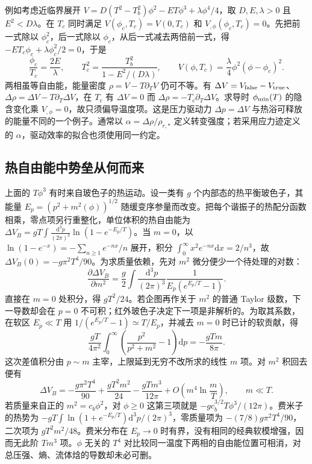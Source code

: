 例如考虑近临界展开 $V=D(T^2-T_b^2)\phi^2-E T\phi^3+\lambda\phi^4/4$，取 $D,E,\lambda>0$ 且 $E^2<D\lambda$。在 $T_c$ 同时满足 $V(\phi_c,T_c)=V(0,T_c)$ 和 $V_{,\phi}(\phi_c,T_c)=0$。先把前一式除以 $\phi_c^2$，后一式除以 $\phi_c$，从后一式减去两倍前一式，得 $-ET_c\phi_c+\lambda\phi_c^2/2=0$，于是
\[
 \frac{\phi_c}{T_c}=\frac{2E}{\lambda},\qquad
 T_c^2=\frac{T_b^2}{1-E^2/(D\lambda)},\qquad
 V(\phi,T_c)=\frac{\lambda}{4}\phi^2(\phi-\phi_c)^2 .
\]
两相虽等自由能，能量密度 $\rho=V-T\partial_TV$ 仍可不等。有 $\Delta V=V_{\rm false}-V_{\rm true}$、$\Delta\rho=\Delta V-T\partial_T\Delta V$，在 $T_c$ 有 $\Delta V=0$ 而 $\Delta\rho=-T_c\partial_T\Delta V$。求导时 $\phi_{\rm min}(T)$ 的隐含变化乘 $V_{,\phi}=0$，故只须偏导温度项。这是压力驱动力 $\Delta p=\Delta V$ 与热浴可释放的能量不同的一个例子。通常以 $\alpha=\Delta\rho/\rho_{r,*}$ 定义转变强度；若采用应力迹定义的 $\alpha$，驱动效率的拟合也须使用同一约定。


\subsection{热自由能中势垒从何而来}

上面的 $T\phi^3$ 有时来自玻色子的热运动。设一类有 $g$ 个内部态的热平衡玻色子，其能量 $E_p=(p^2+m^2(\phi))^{1/2}$ 随缓变序参量而改变。把每个谐振子的热配分函数相乘，零点项另行重整化，单位体积的热自由能为 $\Delta V_B=gT\int\frac{\mathrm d^3p}{(2\pi)^3} \ln(1-e^{-E_p/T})$。当 $m=0$，以 $\ln(1-e^{-x})=-\sum_{n\ge1}e^{-nx}/n$ 展开，积分 $\int_0^\infty x^2e^{-nx}\mathrm dx=2/n^3$，故 $\Delta V_B(0)=-g\pi^2T^4/90$。为求质量依赖，先对 $m^2$ 微分便少一个待处理的对数：
\[
 \frac{\partial\Delta V_B}{\partial m^2}
 =\frac g2\int\frac{\mathrm d^3p}{(2\pi)^3}
                \frac{1}{E_p(e^{E_p/T}-1)}.
\]
直接在 $m=0$ 处积分，得 $gT^2/24$。若企图再作关于 $m^2$ 的普通 Taylor 级数，下一导数却会在 $p=0$ 不可积；红外玻色子决定下一项是非解析的。为取其系数，在软区 $E_p\ll T$ 用 $1/(e^{E_p/T}-1)\simeq T/E_p$，并减去 $m=0$ 时已计的软贡献，得
\[
 \frac{gT}{4\pi^2}\int_0^\infty\left(\frac{p^2}{p^2+m^2}-1\right)\mathrm dp
 =-\frac{gTm}{8\pi}.
\]
这次差值积分由 $p\sim m$ 主宰，上限延到无穷不改所求的线性 $m$ 项。对 $m^2$ 积回去便有
\[
 \Delta V_B=-\frac{g\pi^2T^4}{90}+\frac{gT^2m^2}{24}
             -\frac{gT m^3}{12\pi}
             +O\!\left(m^4\ln\frac{m}{T}\right),\qquad m\ll T .
\]
若质量来自正的 $m^2=c_b\phi^2$，对 $\phi\ge0$ 这第三项就是 $-g c_b^{3/2}T\phi^3/(12\pi)$。费米子的热势为 $-gT\int\ln(1+e^{-E_p/T})\mathrm d^3p/(2\pi)^3$，零质量项为 $-(7/8)g\pi^2T^4/90$，二次项为 $gT^2m^2/48$。费米分布在 $E_p\to0$ 时有界，没有相同的经典软模增强，因而无此阶 $Tm^3$ 项。$\phi$ 无关的 $T^4$ 对比较同一温度下两相的自由能位置可相消，对总压强、熵、流体焓的导数却未必可删。

